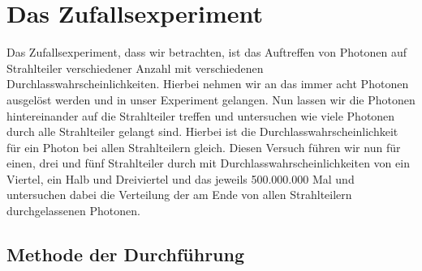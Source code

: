 \clearpage

\section{Das Zufallsexperiment}

Das Zufallsexperiment, dass wir betrachten, ist das Auftreffen von Photonen auf Strahlteiler verschiedener Anzahl mit verschiedenen Durchlasswahrscheinlichkeiten. Hierbei nehmen wir an das immer acht Photonen ausgelöst werden und in unser Experiment gelangen. Nun lassen wir die Photonen hintereinander auf die Strahlteiler treffen und untersuchen wie viele Photonen durch alle Strahlteiler gelangt sind. Hierbei ist die Durchlasswahrscheinlichkeit für ein Photon bei allen Strahlteilern gleich. Diesen Versuch führen wir nun für einen, drei und fünf Strahlteiler durch mit Durchlasswahrscheinlichkeiten von ein Viertel, ein Halb und Dreiviertel und das jeweils 500.000.000 Mal und untersuchen dabei die Verteilung der am Ende von allen Strahlteilern durchgelassenen Photonen.

\subsection{Methode der Durchführung}

